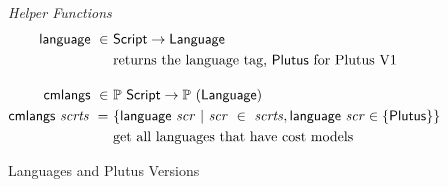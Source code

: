 \begin{figure*}[htb]
  \emph{Helper Functions}
  \begin{align*}
    \fun{language} ~\in~& \Script \to \Language \\
    &\text{returns the language tag, $\Plutus$ for Plutus V1}
    \nextdef
    \fun{cmlangs} ~\in~& \powerset{\Script} \to \powerset{(\Language)} \\
    \fun{cmlangs}~ \var{scrts} ~=~ & \{ \fun{language}~\var{scr} ~\vert~
      \var{scr}~\in~ \var{scrts}, \fun{language}~\var{scr} \in \{\Plutus\}  \}\\
    &\text{get all languages that have cost models}
  \end{align*}
  \caption{Languages and Plutus Versions}
  \label{fig:defs:functions-chain-helper}
\end{figure*}
